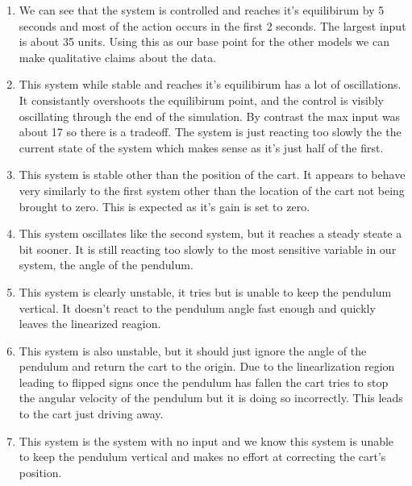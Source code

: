 \documentclass{article}
\begin{document}
\begin{enumerate}[1)]
\item We can see that the system is controlled and reaches it's equilibirum by 5 seconds and most of the action occurs in the first 2 seconds.
The largest input is about 35 units.
Using this as our base point for the other models we can make qualitative claims about the data.

\item This system while stable and reaches it's equilibirum has a lot of oscillations.
It consistantly overshoots the equilibirum point, and the control is visibly oscillating through the end of the simulation.
By contrast the max input was about 17 so there is a tradeoff.
The system is just reacting too slowly the the current state of the system which makes sense as it's just half of the first.

\item This system is stable other than the position of the cart.
It appears to behave very similarly to the first system other than the location of the cart not being brought to zero.
This is expected as it's gain is set to zero.

\item This system oscillates like the second system, but it reaches a steady steate a bit sooner.
It is still reacting too slowly to the most sensitive variable in our system, the angle of the pendulum.

\item This system is clearly unstable, it tries but is unable to keep the pendulum vertical.
It doesn't react to the pendulum angle fast enough and quickly leaves the linearized reagion.

\item This system is also unstable, but it should just ignore the angle of the pendulum and return the cart to the origin.
Due to the linearlization region leading to flipped signs once the pendulum has fallen the cart tries to stop the angular velocity of the pendulum but it is doing so incorrectly.
This leads to the cart just driving away.

\item This system is the system with no input and we know this system is unable to keep the pendulum vertical and makes no effort at correcting the cart's position.
\end{enumerate}
\end{document}
